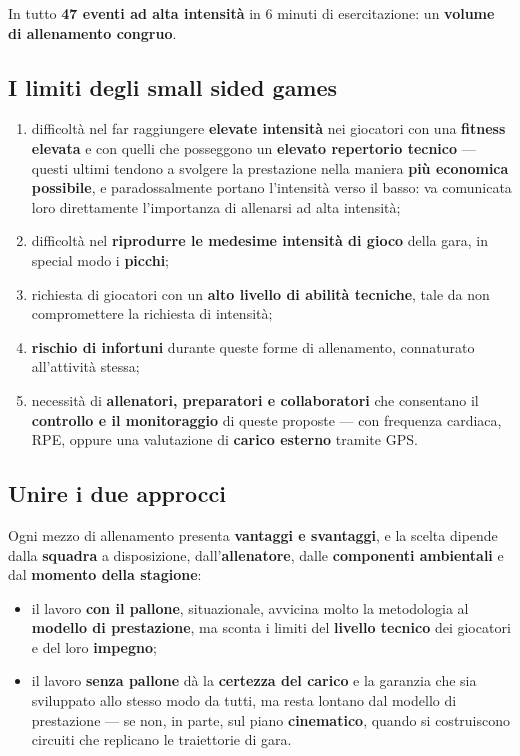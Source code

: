 In tutto \textbf{47 eventi ad alta intensità} in 6 minuti di esercitazione: un \textbf{volume di
allenamento congruo}.

\subsection{I limiti degli small sided games}

\begin{enumerate}
  \item difficoltà nel far raggiungere \textbf{elevate intensità} nei giocatori con una
    \textbf{fitness elevata} e con quelli che posseggono un \textbf{elevato repertorio tecnico} ---
    questi ultimi tendono a svolgere la prestazione nella maniera \textbf{più economica possibile},
    e paradossalmente portano l'intensità verso il basso: va comunicata loro direttamente
    l'importanza di allenarsi ad alta intensità;
  \item difficoltà nel \textbf{riprodurre le medesime intensità di gioco} della gara, in special
    modo i \textbf{picchi};
  \item richiesta di giocatori con un \textbf{alto livello di abilità tecniche}, tale da non
    compromettere la richiesta di intensità;
  \item \textbf{rischio di infortuni} durante queste forme di allenamento, connaturato all'attività
    stessa;
  \item necessità di \textbf{allenatori, preparatori e collaboratori} che consentano il
    \textbf{controllo e il monitoraggio} di queste proposte --- con frequenza cardiaca, RPE, oppure
    una valutazione di \textbf{carico esterno} tramite GPS.
\end{enumerate}

\subsection{Unire i due approcci}

Ogni mezzo di allenamento presenta \textbf{vantaggi e svantaggi}, e la scelta dipende dalla
\textbf{squadra} a disposizione, dall'\textbf{allenatore}, dalle \textbf{componenti ambientali} e
dal \textbf{momento della stagione}:

\begin{itemize}
  \item il lavoro \textbf{con il pallone}, situazionale, avvicina molto la metodologia al
    \textbf{modello di prestazione}, ma sconta i limiti del \textbf{livello tecnico} dei giocatori e
    del loro \textbf{impegno};
  \item il lavoro \textbf{senza pallone} dà la \textbf{certezza del carico} e la garanzia che sia
    sviluppato allo stesso modo da tutti, ma resta lontano dal modello di prestazione --- se non, in
    parte, sul piano \textbf{cinematico}, quando si costruiscono circuiti che replicano le
    traiettorie di gara.
\end{itemize}

